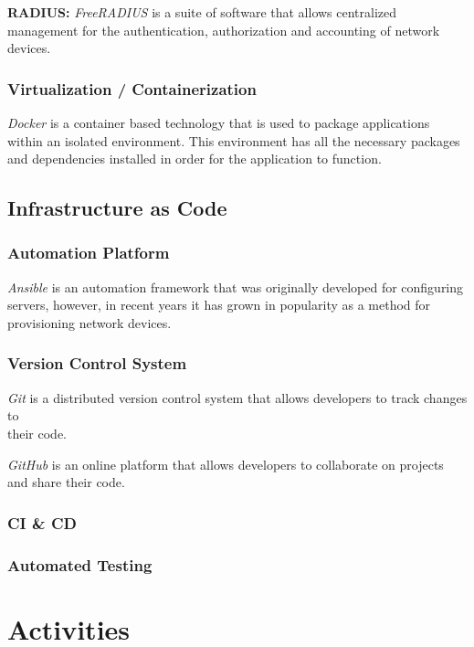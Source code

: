 \documentclass[12pt, letterpaper]{article}
\begin{document}
\smallskip

\textbf{RADIUS:} \textit{FreeRADIUS} is a suite of software that allows centralized management for the authentication, authorization and accounting of network devices.


		\subsubsection{Virtualization / Containerization}
\textit{Docker} is a container based technology that is used to package applications within an isolated environment. This environment has all the necessary packages and dependencies installed in order for the application to function.
		
	\subsection{Infrastructure as Code}
	
		\subsubsection{Automation Platform}
\textit{Ansible} is an automation framework that was originally developed for configuring servers, however, in recent years it has grown in popularity as a method for provisioning network devices.

		\subsubsection{Version Control System}
\textit{Git} is a distributed version control system that allows developers to track changes to \\ their code.

\textit{GitHub} is an online platform that allows developers to collaborate on projects and share their code.

		\subsubsection{CI \& CD}
		
		
		\subsubsection{Automated Testing}
		

\newpage

\section{Activities}
\end{document}
